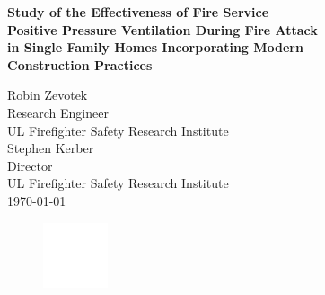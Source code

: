 \documentclass{article}
\begin{document}
	\begin{titlepage}
		
		\pagecolor{ULred}\afterpage{\nopagecolor}
		


			\vspace*{23\baselineskip} 

		\huge
		\begin{adjustwidth}{-0.5in}{-0in}
		\color{white}
		\textbf{Study of the Effectiveness of Fire Service \\ Positive Pressure Ventilation During Fire Attack \\ in Single Family Homes Incorporating Modern \\ Construction Practices\\}
		\end{adjustwidth}
		\begin{adjustwidth}{-0.5in}{}
		\color{white}
		\vspace{.2in}
		\large
		Robin Zevotek \\
		Research Engineer \\
		UL Firefighter Safety Research Institute \\
		\vspace*{\baselineskip}
		Stephen Kerber\\
		Director \\
		UL Firefighter Safety Research Institute \\ 
		\vspace*{\baselineskip}
		\today
		\vspace*{\baselineskip}
		\vspace{.2in}
		\begin{figure}[h]
			\hspace*{-0.5in}\includegraphics[width=0.75in]{0_Images/Section_1/ULLogoWhite.pdf}
		\end{figure}
		\end{adjustwidth}
	\end{titlepage}
\end{document}
